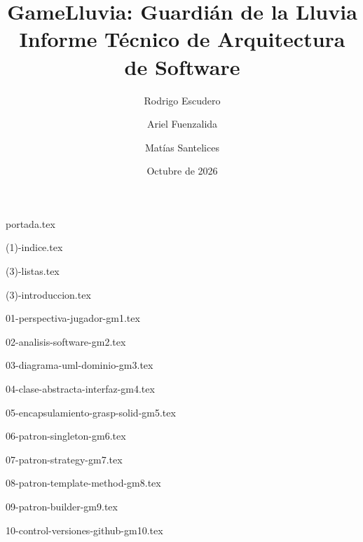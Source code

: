 \documentclass[12pt, letterpaper, table, xcdraw]{inf-pucv}
\title{GameLluvia: Guardián de la Lluvia\\Informe Técnico de Arquitectura de Software}
\author{Rodrigo Escudero \and Ariel Fuenzalida \and Matías Santelices}
\date{Octubre de 2026}
\begin{document}
  {portada.tex}
  \clearpage

  {(1)-indice.tex}
  \clearpage

  {(3)-listas.tex}
  \clearpage

  {(3)-introduccion.tex}
  \clearpage

  {01-perspectiva-jugador-gm1.tex}
  \clearpage

  {02-analisis-software-gm2.tex}
  \clearpage

  {03-diagrama-uml-dominio-gm3.tex}
  \clearpage

  {04-clase-abstracta-interfaz-gm4.tex}
  \clearpage

  {05-encapsulamiento-grasp-solid-gm5.tex}
  \clearpage

  {06-patron-singleton-gm6.tex}
  \clearpage

  {07-patron-strategy-gm7.tex}
  \clearpage

  {08-patron-template-method-gm8.tex}
  \clearpage

  {09-patron-builder-gm9.tex}
  \clearpage

  {10-control-versiones-github-gm10.tex}
  \clearpage

\end{document}
